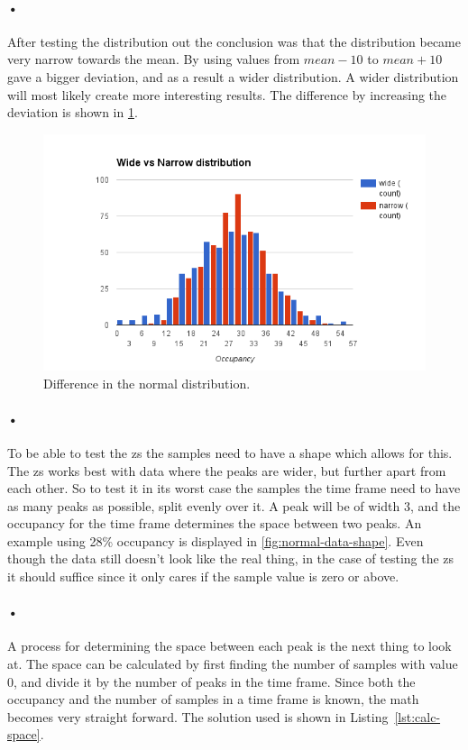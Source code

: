 \documentclass[a4paper, 12pt, openright, twoside]{report}
\begin{document}
\paragraph{•}
After testing the distribution out the conclusion was that the distribution became very narrow towards the mean.
By using values from $mean-10$ to $mean+10$ gave a bigger deviation, and as a result a wider distribution.
A wider distribution will most likely create more interesting results.
The difference by increasing the deviation is shown in \ref{fig:distribution}.

\begin{figure}[h!]
	\centering
		\includegraphics[width=1.0\textwidth]{images/normal-dist-diff.png}
		\caption{Difference in the normal distribution.}
		\label{fig:distribution}
\end{figure}

\paragraph{•}
To be able to test the \gls{zs} the samples need to have a shape which allows for this.
The \gls{zs} works best with data where the peaks are wider, but further apart from each other.
So to test it in its worst case the samples the time frame need to have as many peaks as possible, split evenly over it.
A peak will be of width 3, and the occupancy for the time frame determines the space between two peaks.
An example using 28\% occupancy is displayed in \ref{fig:normal-data-shape}.
Even though the data still doesn't look like the real thing, in the case of testing the \gls{zs} it should suffice since it only cares if the sample value is zero or above.

\paragraph{•}
A process for determining the space between each peak is the next thing to look at.
The space can be calculated by first finding the number of samples with value 0, and divide it by the number of peaks in the time frame.
Since both the occupancy and the number of samples in a time frame is known, the math becomes very straight forward.
The solution used is shown in Listing~\ref{lst:calc-space}.
\end{document}
